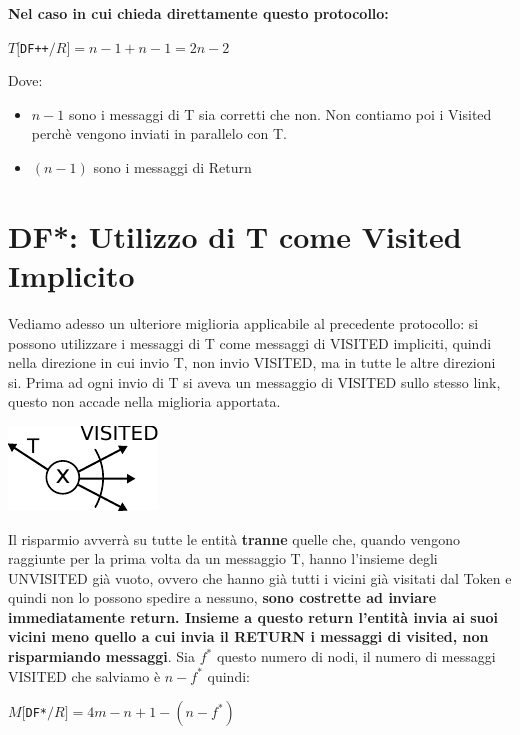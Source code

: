 \textbf{Nel caso in cui chieda direttamente questo protocollo:}
\begin{center}
  $T[$\texttt{DF++}$/R] = n-1 + n-1 = 2n - 2$
\end{center}
Dove:
\begin{itemize}
    \item $n-1$ sono i messaggi di T sia corretti che non. Non contiamo poi i Visited perchè vengono inviati in parallelo con T.
    \item $(n-1)$ sono i messaggi di Return
\end{itemize}

\section{DF*: Utilizzo di T come Visited Implicito}
Vediamo adesso un ulteriore miglioria applicabile al precedente protocollo: si possono utilizzare i messaggi di T come messaggi di VISITED impliciti, quindi nella direzione in cui invio T, non invio VISITED, ma in tutte le altre direzioni si.
Prima ad ogni invio di T si aveva un messaggio di VISITED sullo stesso link, questo non accade nella miglioria apportata. %
\begin{center}
  \includegraphics[scale=1]{images/n_19}
\end{center}
Il risparmio avverrà su tutte le entità \textbf{tranne} quelle che, quando vengono raggiunte per la prima volta da un messaggio T, hanno l'insieme degli UNVISITED già vuoto, ovvero che hanno già tutti i vicini già visitati dal Token e quindi non lo possono spedire a nessuno, \textbf{sono costrette ad inviare immediatamente return. Insieme a questo return l'entità invia ai suoi vicini meno quello a cui invia il RETURN i messaggi di visited, non risparmiando messaggi}. Sia $f^*$ questo numero di nodi, il numero di messaggi VISITED che salviamo è $n-f^*$ quindi:

\begin{center}
  $M[$\texttt{DF*}$/R] = 4m - n + 1 - (n - f^*)$
\end{center}

